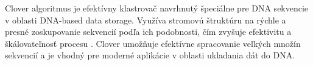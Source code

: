 Clover algoritmus je efektívny klastrovač navrhnutý špeciálne pre DNA sekvencie v oblasti DNA-based data storage. Využíva stromovú štruktúru na rýchle a presné zoskupovanie sekvencií podľa ich podobnosti, čím zvyšuje efektivitu a škálovateľnosť procesu \cite{Qu2022Clover}. Clover umožňuje efektívne spracovanie veľkých množín sekvencií a je vhodný pre moderné aplikácie v oblasti ukladania dát do DNA.
